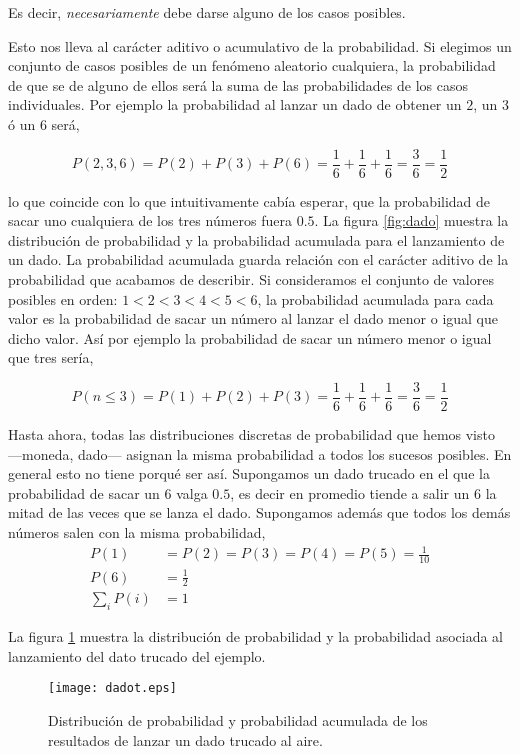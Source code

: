 Es decir, \emph{necesariamente} debe darse alguno de los casos posibles.

Esto nos lleva al carácter aditivo o acumulativo de la probabilidad. Si elegimos un conjunto de casos posibles de un fenómeno aleatorio cualquiera, la probabilidad de que se de alguno de ellos será la suma de las probabilidades de los casos individuales. Por ejemplo la probabilidad al lanzar un dado de obtener un $2$, un $3$ ó un $6$ será,

\begin{equation*}
P(2,3,6) = P(2) + P(3) + P(6) = \frac{1}{6}+\frac{1}{6}+\frac{1}{6}=\frac{3}{6} = \frac{1}{2}
\end{equation*} 

lo que coincide con lo que intuitivamente cabía esperar, que la probabilidad de sacar uno cualquiera de los tres números fuera $0.5$.
La figura \ref{fig:dado} muestra la distribución de probabilidad y la probabilidad acumulada para el lanzamiento de un dado. La probabilidad acumulada guarda relación con el carácter aditivo de la probabilidad que acabamos de describir. Si consideramos el conjunto de valores posibles en orden: $1 < 2 < 3 < 4 < 5 < 6$, la probabilidad acumulada para cada valor es la probabilidad de sacar un número al lanzar el dado menor o igual que dicho valor. Así por ejemplo la probabilidad de sacar un número menor o igual que tres sería,

\begin{equation*}
P(n\leqslant 3) = P(1) + P(2) + P(3) = \frac{1}{6}+\frac{1}{6}+\frac{1}{6}=\frac{3}{6} = \frac{1}{2}
\end{equation*} 

Hasta ahora, todas las distribuciones discretas de probabilidad que hemos visto ---moneda, dado--- asignan la misma probabilidad a todos los sucesos posibles. En general esto no tiene porqué ser así. Supongamos un dado trucado en el que la probabilidad de sacar un $6$ valga $0.5$, es decir en promedio tiende a salir un $6$ la mitad de las veces que se lanza el dado. Supongamos además que todos los demás números salen con la misma probabilidad,
\begin{align*}
P(1)& = P(2) = P(3) = P(4) = P(5) = \frac{1}{10}\\
P(6)& = \frac{1}{2}\\
\sum_i P(i)& = 1 
\end{align*}

La figura \ref{fig:dadot} muestra la distribución de probabilidad y la probabilidad asociada al lanzamiento del dato trucado del ejemplo.
\begin{figure}
\centering
\texttt{[image: dadot.eps]}
\caption{Distribución de probabilidad y probabilidad acumulada de los resultados de lanzar un dado trucado al aire.}
\label{fig:dadot}
\end{figure}


